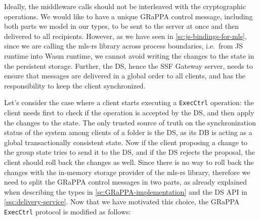 Ideally, the middleware calls should not be interleaved with the cryptographic operations.
We would like to have a unique GRaPPA control message, including both parts we model in our types, 
to be sent to the server
at once and then delivered to all recipients.
However, as we have seen in \cref{sc:js-bindings-for-mls},
since we are calling the mls-rs library across process boundaries, i.e.\ from JS
runtime into Wasm runtime, we cannot avoid writing the changes to the state
in the persistent storage.
Further, the DS, hence the SSF Gateway server, needs to ensure that messages are delivered in
a global order to all clients, and has the responsibility to 
keep the client synchronized.

Let's consider the case where a client starts executing a \texttt{ExecCtrl} operation:
the client needs first to check if the operation is accepted by the DS,
and then apply the changes to the state. The only trusted source of truth
on the synchronization status of the system among clients of a folder is
the DS, as its DB is acting as a global transactionally consistent state.
Now if the client proposing a change to the group state tries to send it
to the DS, and if the DS rejects the proposal, the client should roll back the changes as well.
Since there is no way to roll back the changes with the in-memory storage provider
of the mls-rs library, therefore we need to split the GRaPPA control messages
in two parts, as already explained when describing the types in \cref{sc:GRaPPA-implementation}
and the DS API in \cref{ssc:delivery-service}.
Now that we have motivated this choice, the GRaPPA \texttt{ExecCtrl} protocol is modified as follows:
